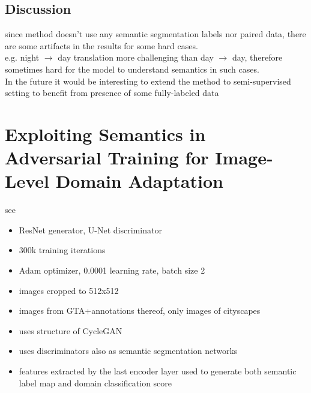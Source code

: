 \documentclass[]{article}
\begin{document}
\subsection{Discussion}
since method doesn't use any semantic segmentation labels nor paired data, there are some artifacts in the results for some hard cases.\\
e.g. night $\rightarrow$ day translation more challenging than day $\rightarrow$ day, therefore sometimes hard for the model to understand semantics in such cases.\\
In the future it would be interesting to extend the method to semi-supervised setting to benefit from presence of some fully-labeled data

\section{Exploiting Semantics in Adversarial Training for Image-Level Domain Adaptation}

see \cite{DBLP:journals/corr/abs-1810-05852}

\begin{itemize}
	\item ResNet generator, U-Net discriminator
	\item 300k training iterations
	\item Adam optimizer, 0.0001 learning rate, batch size 2
	\item images cropped to 512x512
	\item images from GTA+annotations thereof, only images of cityscapes
\end{itemize}

\begin{itemize}
	\item uses structure of CycleGAN
	\item uses discriminators also as semantic segmentation networks
	\item features extracted by the last encoder layer used to generate both semantic label map and domain classification score
\end{itemize}
\end{document}
